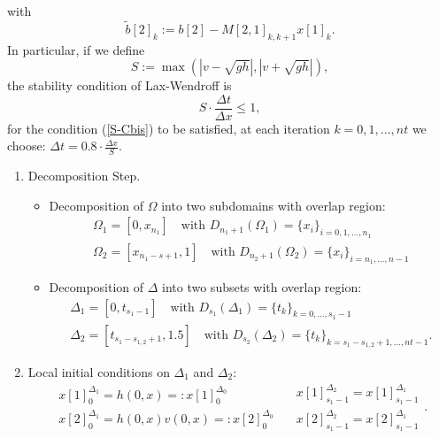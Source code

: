 \documentclass[smallcondensed]{svjour3}
\begin{document}
with 
\begin{equation}\label{tilde_b[2]}
\tilde{b}[2]_{k}:={b}[2]-M[2,1]_{k,k+1}x[1]_{k}.
\end{equation}
In particular, if we define 
\begin{equation}\label{S-C}
S:=\max \left(|v-\sqrt{gh}|,|v+\sqrt{gh}|\right),
\end{equation}
the stability condition of  Lax-Wendroff is
\begin{equation}\label{S-Cbis}
S\cdot \frac{\Delta t}{\Delta x} \le 1,
\end{equation}
for the condition (\ref{S-Cbis}) to be satisfied, at each iteration $k=0,1,\ldots,nt$ we choose: $\Delta t=0.8\cdot \frac{\Delta x}{S}$.
\begin{enumerate}
\item Decomposition Step.
\begin{itemize}
\item Decomposition of  $\Omega$ into two subdomains with overlap region:
\begin{equation}
\begin{array}{ll} 
\Omega_{1}=[0,x_{n_{1}}] \quad \textrm{with $D_{n_{1}+1}(\Omega_1)=\{x_{i}\}_{i=0,1,\ldots,n_1}$ }\\
\Omega_{2}=[x_{n_{1}-s+1},1] \quad  \textrm{with $D_{n_{2}+1}({\Omega}_{2})=\{x_{i}\}_{i=n_{1},\ldots,n-1}$}
\end{array}
\end{equation}
\item Decomposition of  $\Delta$ into two subsets with overlap region:
\begin{equation}
\begin{array}{ll}
\Delta_{1}=[0,t_{s_{1}-1}] \quad \textrm{with $D_{s_{1}}(\Delta_{1})=\{t_{k}\}_{k=0,\ldots,s_{1}-1}$}  \\
\Delta_{2}=[t_{s_{1}-s_{1,2}+1},1.5] \quad  \textrm{with $D_{s_{2}}(\Delta_{2})=\{t_{k}\}_{k=s_{1}-s_{1,2}+1,\ldots,nt-1}$}.
\end{array}
\end{equation}
\end{itemize}
\item Local initial conditions on  $\Delta_{1}$ and $\Delta_{2}$:
\begin{equation}\label{initial}
\begin{array}{ll}
x[1]_{0}^{\Delta_{1}}=h(0,x)=:x[1]_{0}^{\Delta_{0}}\\
x[2]_{0}^{\Delta_{1}}=h(0,x)v(0,x)=:x[2]_{0}^{\Delta_{0}}
\end{array}\quad
\begin{array}{ll}
x[1]_{{s_{1}-1}}^{\Delta_{2}}=x[1]_{{s_{1}-1}}^{\Delta_{1}}\\
x[2]_{{s_{1}-1}}^{\Delta_{2}}=x[2]_{{s_{1}-1}}^{\Delta_{1}}
\end{array}.
\end{equation}
 

\end{enumerate}
\end{document}
